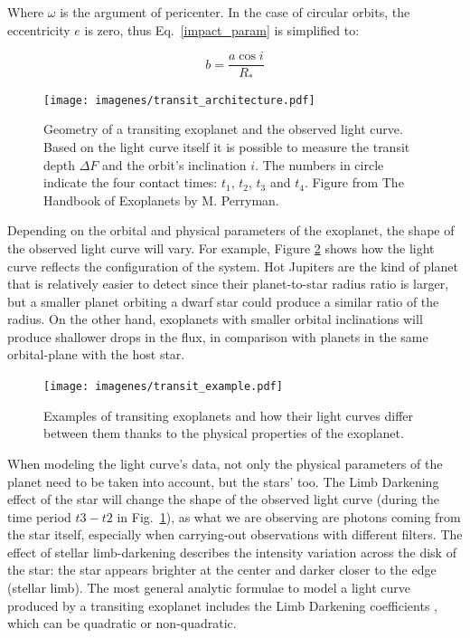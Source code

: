 Where $\omega$ is the argument of pericenter. In the case of circular orbits, the eccentricity $e$ is zero, thus Eq.~\ref{impact_param} is simplified to:

\begin{equation}
    b = \frac{a\cos{i}}{R_{*}}
\label{impact_param_simple}
\end{equation}

\begin{figure}[ht]
\centering
\texttt{[image: imagenes/transit\_architecture.pdf]}
\caption{Geometry of a transiting exoplanet and the observed light curve. Based on the light curve itself it is possible to measure the transit depth $\Delta F$ and the orbit's inclination $i$. The numbers in circle indicate the four contact times: $t_{1}$, $t_{2}$, $t_{3}$ and $t_{4}$.  Figure from The Handbook of Exoplanets by M. Perryman.}
\label{transit}
\end{figure}

Depending on the orbital and physical parameters of the exoplanet, the shape of the observed light curve will vary. For example, Figure \ref{transit_examples} shows how the light curve reflects the configuration of the system. Hot Jupiters are the kind of planet that is relatively easier to detect since their planet-to-star radius ratio is larger, but a smaller planet orbiting a dwarf star could produce a similar ratio of the radius. On the other hand, exoplanets with smaller orbital inclinations will produce shallower drops in the flux, in comparison with planets in the same orbital-plane with the host star.     

\begin{figure}[h]
\centering
\texttt{[image: imagenes/transit\_example.pdf]}
\caption{Examples of transiting exoplanets and how their light curves differ between them thanks to the physical properties of the exoplanet.}
\label{transit_examples}
\end{figure}

When modeling the light curve's data, not only the physical parameters of the planet need to be taken into account, but the stars' too. The Limb Darkening effect of the star will change the shape of the observed light curve (during the time period $t3 - t2$ in Fig.~\ref{transit}), as what we are observing are photons coming from the star itself, especially when carrying-out observations with different filters. The effect of stellar limb-darkening describes the intensity variation across the disk of the star: the star appears brighter at the center and darker closer to the edge (stellar limb). The most general analytic formulae to model a light curve produced by a transiting exoplanet includes the Limb Darkening coefficients \citep{Mandel2002}, which can be quadratic or non-quadratic.

